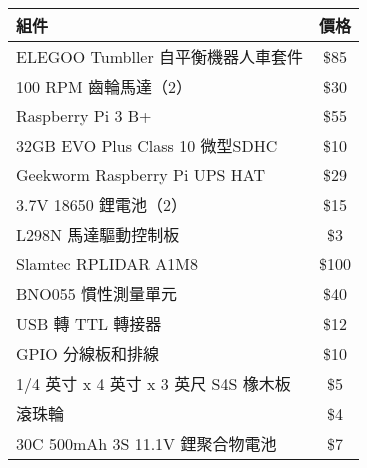 \begin{table}[ht]
\centering
\begin{tabular}{|l|c|}
\hline
\textbf{組件} & \textbf{價格} \\
\hline
ELEGOO Tumbller 自平衡機器人車套件 & \$85 \\
100 RPM 齒輪馬達（2） & \$30 \\
Raspberry Pi 3 B+ & \$55 \\
32GB EVO Plus Class 10 微型SDHC & \$10 \\
Geekworm Raspberry Pi UPS HAT & \$29 \\
3.7V 18650 鋰電池（2） & \$15 \\
L298N 馬達驅動控制板 & \$3 \\
Slamtec RPLIDAR A1M8 & \$100 \\
BNO055 慣性測量單元 & \$40 \\
USB 轉 TTL 轉接器 & \$12 \\
GPIO 分線板和排線 & \$10 \\
1/4 英寸 x 4 英寸 x 3 英尺 S4S 橡木板 & \$5 \\
滾珠輪 & \$4 \\
30C 500mAh 3S 11.1V 鋰聚合物電池 & \$7 \\
\hline
\end{tabular}
\end{table} 
